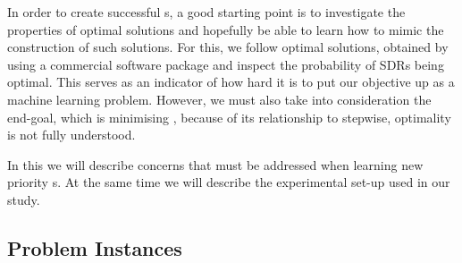 \documentclass[twocolumn]{svjour3}
\begin{document}
In order to create successful \dr s, a good starting point is to 
investigate the properties of optimal solutions and hopefully be able to learn 
how to mimic the construction of such solutions. For this, we follow optimal 
solutions, 
obtained by using a commercial software package \cite{gurobi} and inspect 
the probability of SDRs being optimal. This serves as an indicator of how hard 
it is to put our objective up as a machine learning problem. 
However, we must also take into consideration the end-goal, which is minimising 
\namerho, because of its relationship to stepwise, optimality is not fully 
understood.


In this  we will describe concerns that must be 
addressed when learning new priority \dr s. At the same time we will describe 
the experimental set-up used in our study. 

\subsection{Problem Instances}\label{sec:data:sim}
\end{document}
